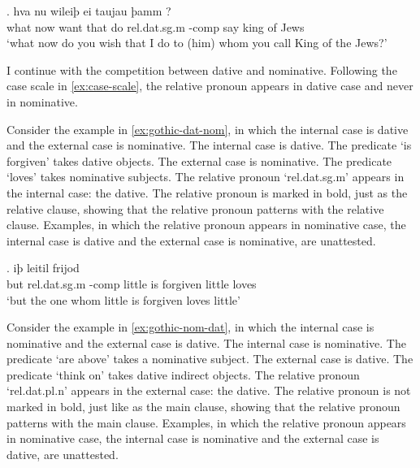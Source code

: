 \exg. hva nu wileiþ ei taujau þamm    ?\\
 what now want that do\scsub{[dat]} \ac{rel}.\ac{dat}.\ac{sg}.\ac{m} -\ac{comp} say\scsub{[acc]} king {of Jews}\\
 `what now do you wish that I do to (him) whom you call King of the Jews?' \label{ex:gothic-dat-acc-rep}

I continue with the competition between dative and nominative. Following the case scale in \ref{ex:case-scale}, the relative pronoun appears in dative case and never in nominative.

Consider the example in \ref{ex:gothic-dat-nom}, in which the internal case is dative and the external case is nominative.
The internal case is dative. The predicate  `is forgiven' takes dative objects.
The external case is nominative. The predicate  `loves' takes nominative subjects.
The relative pronoun  `\ac{rel}.\ac{dat}.\ac{sg}.\ac{m}' appears in the internal case: the dative. The relative pronoun is marked in bold, just as the relative clause, showing that the relative pronoun patterns with the relative clause.
Examples, in which the relative pronoun appears in nominative case, the internal case is dative and the external case is nominative, are unattested.

\exg. iþ     leitil frijod\\
 but \ac{rel}.\ac{dat}.\ac{sg}.\ac{m} -\ac{comp} little {is forgiven}\scsub{[dat]} little loves\scsub{[nom]}\\
 `but the one whom little is forgiven loves little' \label{ex:gothic-dat-nom}

Consider the example in \ref{ex:gothic-nom-dat}, in which the internal case is nominative and the external case is dative.
The internal case is nominative. The predicate  `are above' takes a nominative subject.
The external case is dative. The predicate  `think on' takes dative indirect objects.
The relative pronoun  `\ac{rel}.\ac{dat}.\ac{pl}.\ac{n}' appears in the external case: the dative. The relative pronoun is not marked in bold, just like as the main clause, showing that the relative pronoun patterns with the main clause.
Examples, in which the relative pronoun appears in nominative case, the internal case is nominative and the external case is dative, are unattested.

